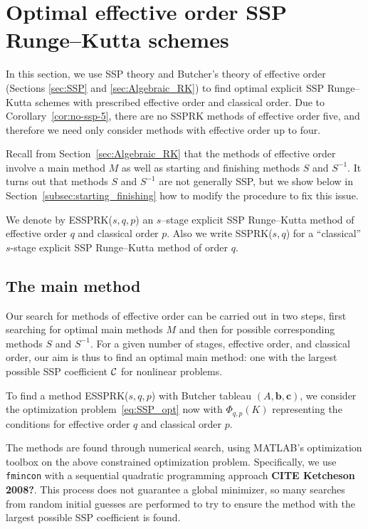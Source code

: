 \section{Optimal effective order SSP Runge--Kutta schemes}\label{sec:optimal_ESSPRK}

In this section, we use SSP theory and Butcher's theory of effective
order (Sections \ref{sec:SSP} and \ref{sec:Algebraic_RK}) to find
optimal explicit SSP Runge--Kutta schemes with prescribed effective
order and classical order.
Due to Corollary~\ref{cor:no-ssp-5}, there are no SSPRK methods of
effective order five, and therefore we need only consider methods with
effective order up to four.

Recall from Section~\ref{sec:Algebraic_RK} that the methods of
effective order involve a main method $M$ as well as starting and
finishing methods $S$ and $S^{-1}$.
It turns out that methods $S$ and $S^{-1}$ are not generally SSP, but
we show below in Section~\ref{subsec:starting_finishing} how to modify
the procedure to fix this issue.

We denote by ESSPRK($s,q,p$) an $s$--stage explicit SSP Runge--Kutta method of effective
order $q$ and classical order $p$.
Also we write SSPRK($s,q$) for a ``classical'' $s$-stage explicit SSP Runge--Kutta method of
order $q$.

\subsection{The main method}\label{subsec:main_method}

Our search for methods of effective order can be carried out in two
steps, first searching for optimal main methods $M$ and then for
possible corresponding methods $S$ and $S^{-1}$.
For a given number of stages, effective order, and classical order,
our aim is thus to find an optimal main method: one with the largest
possible SSP coefficient $\mathcal{C}$ for nonlinear problems.

To find a method ESSPRK($s,q,p$) with Butcher tableau $(A, \bm{b},
\bm{c})$, we consider the optimization problem~\eqref{eq:SSP_opt} now
with $\Phi_{q,p}(K)$ representing the conditions for effective order
$q$ and classical order $p$.

The methods are found through numerical search, using \textsc{MATLAB}'s optimization 
toolbox on the above constrained optimization problem. 
Specifically, we use \texttt{fmincon} with a sequential quadratic programming approach \textbf{CITE Ketcheson 2008?}.
This process does not guarantee a global minimizer, so many searches from random initial 
guesses are performed to try to ensure the method with the largest possible SSP coefficient is 
found.

